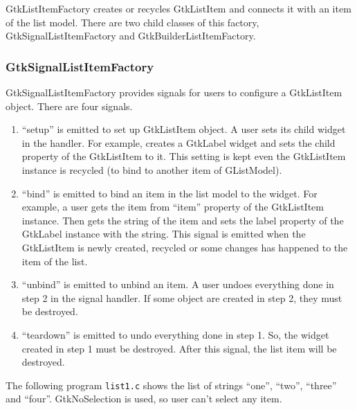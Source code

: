 GtkListItemFactory creates or recycles GtkListItem and connects it with
an item of the list model. There are two child classes of this factory,
GtkSignalListItemFactory and GtkBuilderListItemFactory.

\subsubsection{GtkSignalListItemFactory}\label{gtksignallistitemfactory}

GtkSignalListItemFactory provides signals for users to configure a
GtkListItem object. There are four signals.

\begin{enumerate}
\def\labelenumi{\arabic{enumi}.}
\tightlist
\item
  ``setup'' is emitted to set up GtkListItem object. A user sets its
  child widget in the handler. For example, creates a GtkLabel widget
  and sets the child property of the GtkListItem to it. This setting is
  kept even the GtkListItem instance is recycled (to bind to another
  item of GListModel).
\item
  ``bind'' is emitted to bind an item in the list model to the widget.
  For example, a user gets the item from ``item'' property of the
  GtkListItem instance. Then gets the string of the item and sets the
  label property of the GtkLabel instance with the string. This signal
  is emitted when the GtkListItem is newly created, recycled or some
  changes has happened to the item of the list.
\item
  ``unbind'' is emitted to unbind an item. A user undoes everything done
  in step 2 in the signal handler. If some object are created in step 2,
  they must be destroyed.
\item
  ``teardown'' is emitted to undo everything done in step 1. So, the
  widget created in step 1 must be destroyed. After this signal, the
  list item will be destroyed.
\end{enumerate}

The following program \passthrough{\lstinline!list1.c!} shows the list
of strings ``one'', ``two'', ``three'' and ``four''. GtkNoSelection is
used, so user can't select any item.

